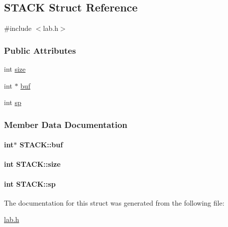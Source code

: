 \hypertarget{structSTACK}{\subsection{S\+T\+A\+C\+K Struct Reference}
\label{structSTACK}
}


{\ttfamily \#include $<$lab.\+h$>$}

\subsubsection*{Public Attributes}
\begin{DoxyCompactItemize}
\item 
int \hyperlink{structSTACK_ad10f9d8025122e8c82832d7a34c77e40}{size}
\item 
int $\ast$ \hyperlink{structSTACK_a6d512f82cbd75729347a293193039538}{buf}
\item 
int \hyperlink{structSTACK_a1b186cf876dace2f1e30fcbe260cad9a}{sp}
\end{DoxyCompactItemize}


\subsubsection{Member Data Documentation}
\hypertarget{structSTACK_a6d512f82cbd75729347a293193039538}{
\paragraph[{buf}]{\setlength{\rightskip}{0pt plus 5cm}int$\ast$ S\+T\+A\+C\+K\+::buf}}\label{structSTACK_a6d512f82cbd75729347a293193039538}
\hypertarget{structSTACK_ad10f9d8025122e8c82832d7a34c77e40}{
\paragraph[{size}]{\setlength{\rightskip}{0pt plus 5cm}int S\+T\+A\+C\+K\+::size}}\label{structSTACK_ad10f9d8025122e8c82832d7a34c77e40}
\hypertarget{structSTACK_a1b186cf876dace2f1e30fcbe260cad9a}{
\paragraph[{sp}]{\setlength{\rightskip}{0pt plus 5cm}int S\+T\+A\+C\+K\+::sp}}\label{structSTACK_a1b186cf876dace2f1e30fcbe260cad9a}


The documentation for this struct was generated from the following file\+:\begin{DoxyCompactItemize}
\item 
\hyperlink{lab_8h}{lab.\+h}\end{DoxyCompactItemize}
